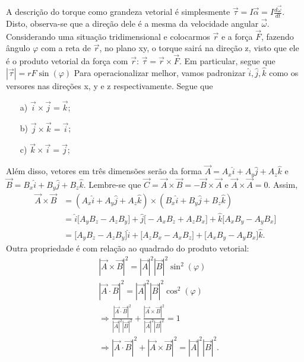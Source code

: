 \documentclass{article}
\begin{document}
A descrição do torque como grandeza vetorial é simplesmente \(\vec{\tau } = I \vec{\alpha } = I \frac{d \vec{\omega }}{dt}\). Disto, observa-se 
que a direção dele é a mesma da velocidade angular \(\vec{\omega }\). Considerando uma situação tridimensional e colocarmos 
\(\vec{r}\) e a força \(\vec{F}\), fazendo ângulo \(\varphi \) com a reta de \(\vec{r}\), no plano xy, o torque sairá na direção z, visto que ele é o produto vetorial da força com 
\(\vec{r}\): \(\vec{\tau } = \vec{r}\times \vec{F}\). Em particular, segue que \(|\vec{\tau }| = rF\sin{(\varphi )}\)
Para operacionalizar melhor, vamos padronizar \(\hat{i}, \hat{j}, \hat{k}\) como os versores nas direções x, y e z respectivamente. Segue que 
\begin{itemize}
  \item[a)] \(\vec{i}\times \vec{j} = \vec{k}\);
  \item[b)] \(\vec{j}\times \vec{k} = \vec{i}\);
  \item[c)] \(\vec{k}\times \vec{i} = \vec{j}\);
\end{itemize}
Além disso, vetores em três dimensões serão da forma \(\vec{A} = A_{x}\hat{i} + A_{y}\hat{j} + A_{z}\hat{k}\) e \(\vec{B} = B_{x}\hat{i} + B_{y}\hat{j} + B_{z}\hat{k}\). 
Lembre-se que \(\vec{C} = \vec{A} \times \vec{B} = -\vec{B}\times \vec{A}\) e \(\vec{A} \times \vec{A} = 0.\) Assim, 
\begin{align*}
  \vec{A} \times \vec{B} &= (A_{x}\hat{i} + A_{y}\hat{j} + A_{z}\hat{k})\times(B_{x}\hat{i} + B_{y}\hat{j} + B_{z}\hat{k})\\
                         &= \hat{i}\biggl[A_{y}B_{z} - A_{z}B_{y}\biggr] + \hat{j}\biggl[-A_{x}B_{z} + A_{z}B_{x}\biggr] + \hat{k}\biggl[A_{x}B_{y}-A_{y}B_{x}\biggr]\\
                         &= \biggl[A_{y}B_{z} - A_{z}B_{y}\biggr]\hat{i} + \biggl[A_{z}B_{x} - A_{x}B_{z}\biggr] + \biggl[A_{x}B_{y}-A_{y}B_{x}\biggr]\hat{k}.
\end{align*}
Outra propriedade é com relação ao quadrado do produto vetorial:
\begin{align*}
   &|\vec{A}\times \vec{B}|^{2} = |\vec{A}|^{2}|\vec{B}|^{2}\sin^{2}{(\varphi )}\\
   &|\vec{A}\cdot \vec{B}|^{2} = |\vec{A}|^{2}|\vec{B}|^{2}\cos^{2}{(\varphi )}\\
   &\Rightarrow \frac{|\vec{A}\cdot \vec{B}|^{2}}{|\vec{A}|^{2}|\vec{B}|^{2}} + \frac{|\vec{A}\times \vec{B}|^{2}}{|\vec{A}|^{2}|\vec{B}|^{2}} = 1\\
   &\Rightarrow  |\vec{A}\cdot \vec{B}|^{2} + |\vec{A}\times \vec{B}|^{2} = |\vec{A}|^{2}|\vec{B}|^{2}.
\end{align*}
\newpage
\end{document}
